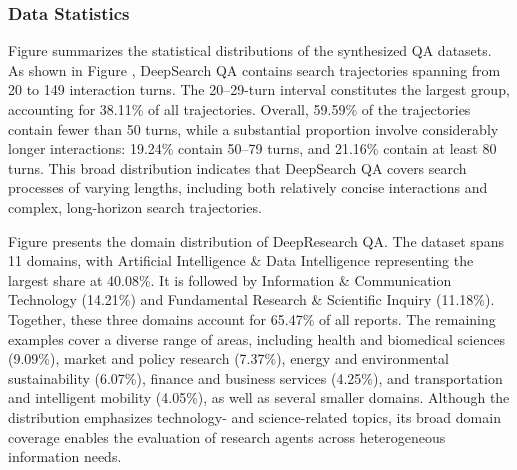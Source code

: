 \documentclass{huawei}
\begin{document}
\subsubsection{Data Statistics}
Figure  summarizes the statistical distributions of the synthesized QA datasets. As shown in Figure , DeepSearch QA contains search trajectories spanning from 20 to 149 interaction turns. The 20–29-turn interval constitutes the largest group, accounting for 38.11\% of all trajectories. Overall, 59.59\% of the trajectories contain fewer than 50 turns, while a substantial proportion involve considerably longer interactions: 19.24\% contain 50–79 turns, and 21.16\% contain at least 80 turns. This broad distribution indicates that DeepSearch QA covers search processes of varying lengths, including both relatively concise interactions and complex, long-horizon search trajectories.


Figure  presents the domain distribution of DeepResearch QA. The dataset spans 11 domains, with Artificial Intelligence \& Data Intelligence representing the largest share at 40.08\%. It is followed by Information \& Communication Technology (14.21\%) and Fundamental Research \& Scientific Inquiry (11.18\%). Together, these three domains account for 65.47\% of all reports. The remaining examples cover a diverse range of areas, including health and biomedical sciences (9.09\%), market and policy research (7.37\%), energy and environmental sustainability (6.07\%), finance and business services (4.25\%), and transportation and intelligent mobility (4.05\%), as well as several smaller domains. Although the distribution emphasizes technology- and science-related topics, its broad domain coverage enables the evaluation of research agents across heterogeneous information needs.
\end{document}
